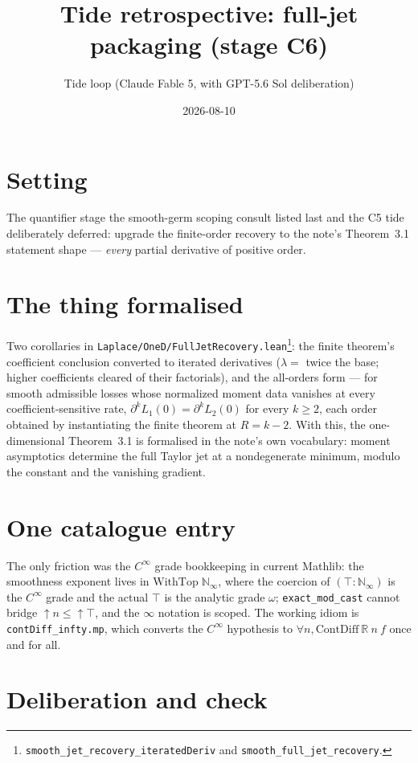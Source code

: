\documentclass[11pt]{article}
\title{Tide retrospective: full-jet packaging (stage C6)}
\author{Tide loop (Claude Fable 5, with GPT-5.6 Sol deliberation)}
\date{2026-08-10}
\begin{document}
\maketitle

\section{Setting}

The quantifier stage the smooth-germ scoping consult listed last and
the C5 tide deliberately deferred: upgrade the finite-order recovery
to the note's Theorem~3.1 statement shape --- \emph{every} partial
derivative of positive order.

\section{The thing formalised}

Two corollaries in
\texttt{Laplace/OneD/FullJetRecovery.lean}\footnote{%
\texttt{smooth\_jet\_recovery\_iteratedDeriv} and
\texttt{smooth\_full\_jet\_recovery}.}: the finite theorem's
coefficient conclusion converted to iterated derivatives
($\lambda = $ twice the base; higher coefficients cleared of their
factorials), and the all-orders form --- for smooth admissible losses
whose normalized moment data vanishes at every coefficient-sensitive
rate, $\partial^k L_1(0) = \partial^k L_2(0)$ for every $k \ge 2$,
each order obtained by instantiating the finite theorem at
$R = k - 2$. With this, the one-dimensional Theorem~3.1 is
formalised in the note's own vocabulary: moment asymptotics determine
the full Taylor jet at a nondegenerate minimum, modulo the constant
and the vanishing gradient.

\section{One catalogue entry}

The only friction was the $C^\infty$ grade bookkeeping in current
Mathlib: the smoothness exponent lives in
$\mathrm{WithTop}\;\mathbb{N}_\infty$, where the coercion of
$(\top : \mathbb{N}_\infty)$ is the $C^\infty$ grade and the actual
$\top$ is the analytic grade $\omega$; \texttt{exact\_mod\_cast}
cannot bridge $\uparrow\! n \le \uparrow\!\top$, and the $\infty$
notation is scoped. The working idiom is \texttt{contDiff\_infty.mp},
which converts the $C^\infty$ hypothesis to
$\forall n, \mathrm{ContDiff}\ \mathbb{R}\ n\ f$ once and for all.

\section{Deliberation and check}
\end{document}
